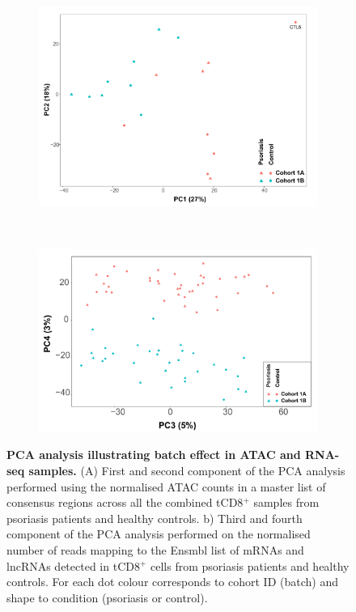 \bigskip
\begin{figure}[htbp]
\centering
\begin{subfigure}[b]{0.50\textwidth}
\centering 
\includegraphics[width=\textwidth]{./Appendix/pdfs/Chapter4/ATAC_CD8_PS_CTL_PCA}
\caption{}
\end{subfigure}
~
\begin{subfigure}[b]{0.50\textwidth} 
\centering
\includegraphics[width=\textwidth]{./Appendix/pdfs/Chapter4/PS_CTL_all_samples_varied_PCA3and4_plot}
\caption{}
\end{subfigure}
\caption[PCA analysis illustrating batch effect in ATAC and RNA-seq samples.]{\textbf{PCA analysis illustrating batch effect in ATAC and RNA-seq samples.} (A) First and second component of the PCA analysis performed using the normalised ATAC  counts in a master list of consensus regions across all the combined tCD8$^+$ samples from psoriasis patients and healthy controls. b) Third and fourth component of the PCA analysis performed on the normalised number of reads mapping to the Ensmbl list of mRNAs and lncRNAs detected in tCD8$^+$ cells from psoriasis patients and healthy controls. For each dot colour corresponds to cohort ID (batch) and shape to condition (psoriasis or control).}
\label{figure:ATAC_RNAseq_batch_effect}
\end{figure}



